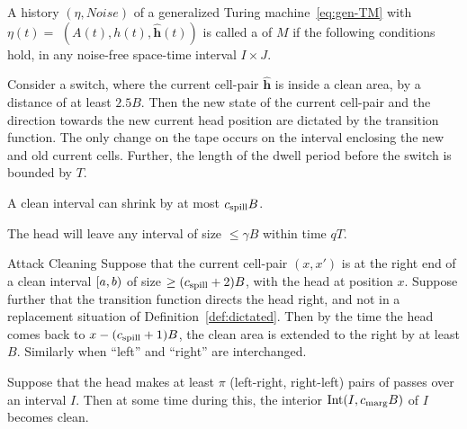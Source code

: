\documentclass[11pt]{memoir}
\theoremstyle{definition} %
\renewcommand{\le}{\leq}
\renewcommand{\ge}{\geq}
\renewcommand{\vek}[1]{\mathbf{#1}}
\def\B{B}
\newcommand{\escno}{q}
\newcommand{\h}{h} %
\newcommand{\vhc}{\vek{\hat h}}
\newcommand{\Int}{\mathrm{Int}} %
\newcommand{\Noise}{\mathit{Noise}}
\newcommand{\passno}{\pi}
\newcommand{\Tu}{T}
\newcommand{\cns}[1]{c_{\textrm{\upshape #1}}}
\newcommand{\CMarg}{\cns{marg}}
\newcommand{\CSpill}{\cns{spill}}
\begin{document}
  \begin{definition}[Trajectory]\label{def:traj}
\begin{sloppypar}
   A history  \( (\eta, \Noise) \) of a generalized Turing 
machine~\eqref{eq:gen-TM} with \(\eta(t) =\)
\( (A(t), \h(t), \vhc(t)) \)
is called a  of \( M \) if the following conditions hold, in any 
noise-free space-time interval \( I\times J \).
  \end{sloppypar}
\begin{description}

\item[Transition Function]\label{i:def.traj.transition}
Consider a switch, where the current cell-pair \( \vhc \)
is inside a clean area, by a distance of at least \( 2.5\B \). %
Then the new state of the current cell-pair and
the direction towards the new current head position
are dictated by the transition function.
The only change on the tape occurs on the interval enclosing the new and old current cells.
Further, the length of the dwell period before the switch is bounded by \( \Tu \).

\item[Spill Bound]\label{i:spill-bound}
  A clean interval can shrink by at most \( \CSpill \B \).

\item[Escape] \label{i:def.traj.escape}
  The head will leave any interval of size \( \le \gamma\B \) 
  within time \( \escno\Tu \).

\begin{sloppypar}
\item[Attack Cleaning] \label{i:def.traj.attack-cleaning}
  Suppose that the current cell-pair \( (x,x') \)
  is at the right end of a clean interval \( \left[a,b\right) \) of size
\( \ge (\CSpill+2)\B \), with the head at position \( x \).
Suppose further that the transition function directs the head right,
and not in a replacement situation of Definition~\ref{def:dictated}.
Then by the time the head comes back to \( x-(\CSpill+1)\B \), the clean area is extended
to the right by at least \( \B \).
Similarly when ``left'' and ``right'' are interchanged.
 \end{sloppypar}

\item[Pass Cleaning]
  Suppose that the head makes at least \( \passno \) (left-right, right-left) pairs
  of passes over an interval \( I \).
  Then at some time during this, the interior \( \Int(I, \CMarg\B) \) of \( I \) becomes clean.

\end{description}
\end{definition}
\end{document}
